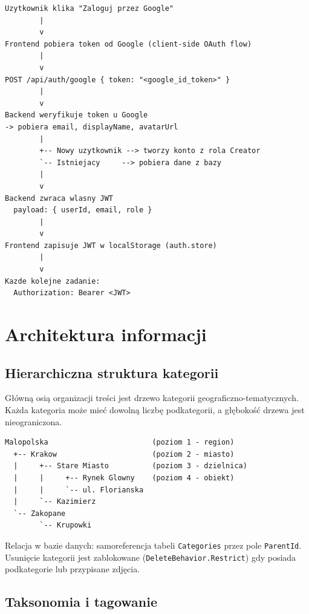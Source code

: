 \documentclass[12pt, a4paper]{article}
\begin{document}
\begin{lstlisting}[style=plain, caption={Sekwencja logowania przez OAuth}]
Uzytkownik klika "Zaloguj przez Google"
        |
        v
Frontend pobiera token od Google (client-side OAuth flow)
        |
        v
POST /api/auth/google { token: "<google_id_token>" }
        |
        v
Backend weryfikuje token u Google
-> pobiera email, displayName, avatarUrl
        |
        +-- Nowy uzytkownik --> tworzy konto z rola Creator
        `-- Istniejacy     --> pobiera dane z bazy
        |
        v
Backend zwraca wlasny JWT
  payload: { userId, email, role }
        |
        v
Frontend zapisuje JWT w localStorage (auth.store)
        |
        v
Kazde kolejne zadanie:
  Authorization: Bearer <JWT>
\end{lstlisting}

\section{Architektura informacji}

\subsection{Hierarchiczna struktura kategorii}

Główną osią organizacji treści jest drzewo kategorii geograficzno-tematycznych.
Każda kategoria może mieć dowolną liczbę podkategorii, a głębokość drzewa jest
nieograniczona.

\begin{lstlisting}[style=plain, caption={Przykładowa hierarchia kategorii}]
Malopolska                        (poziom 1 - region)
  +-- Krakow                      (poziom 2 - miasto)
  |     +-- Stare Miasto          (poziom 3 - dzielnica)
  |     |     +-- Rynek Glowny    (poziom 4 - obiekt)
  |     |     `-- ul. Florianska
  |     `-- Kazimierz
  `-- Zakopane
        `-- Krupowki
\end{lstlisting}

Relacja w bazie danych: samoreferencja tabeli \texttt{Categories} przez pole \texttt{ParentId}.
Usunięcie kategorii jest zablokowane (\texttt{DeleteBehavior.Restrict}) gdy posiada
podkategorie lub przypisane zdjęcia.

\subsection{Taksonomia i tagowanie}
\end{document}
